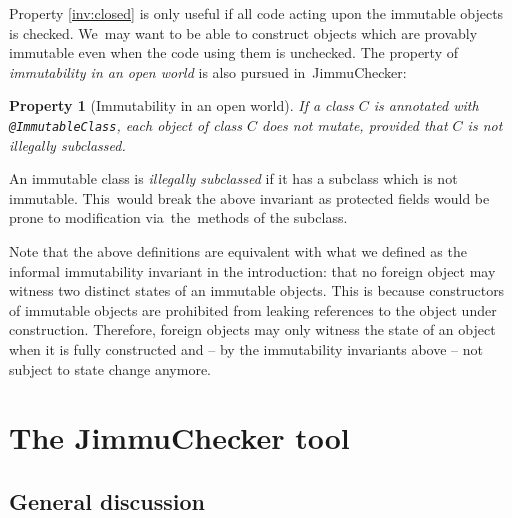 \documentclass{pracamgr}
\theoremstyle{break}
\theoremstyle{break}
\newtheorem{invariant}{Property}
\theoremstyle{break}
\begin{document}
Property \ref{inv:closed} is only useful if all code acting upon the
immutable objects is checked. We~may want to be able to construct
objects which are provably immutable even when the code using them is
unchecked. The property of \emph{immutability in an open world} is also
pursued in~JimmuChecker:
\begin{invariant}[Immutability in an open world] \label{inv:open}
  If a class $C$ is annotated with \texttt{@ImmutableClass}, each
  object of class $C$ does not mutate, provided that $C$ is not
  illegally subclassed.
\end{invariant}

An immutable class is \emph{illegally subclassed} if it has a subclass
which is not immutable. This~would break the above invariant as
protected fields would be prone to modification via~the~methods of
the subclass.

Note that the above definitions are equivalent with what we defined as
the informal immutability invariant in the introduction: that no
foreign object may witness two distinct states of an immutable
objects. This is because constructors of immutable objects are
prohibited from leaking references to the object under
construction. Therefore, foreign objects may only witness the state of
an object when it is fully constructed and -- by the immutability
invariants above -- not subject to state change anymore.


\chapter{The JimmuChecker tool}
\label{chap:checker}

\section{General discussion}
\end{document}
